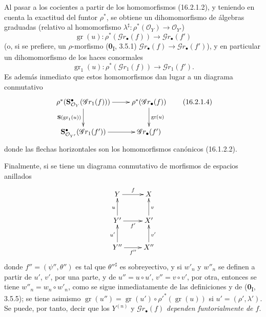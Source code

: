 \begin{env}[16.2.1]
Al pasar a los cocientes a partir de los homomorfismos (16.2.1.2), y teniendo en
cuenta la exactitud del funtor $\rho^*$, se obtiene un dihomomorfismo
de álgebras graduadas (relativo al homomorfismo
$\lambda^\sharp:\rho^*(\mathcal{O}_Y)\to\mathcal{O}_{Y'}$)
\[
  \operatorname{gr}(u):
  \rho^*(\mathscr{G}r_\bullet(f))
  \longrightarrow\mathscr{G}r_\bullet(f')
  \tag{16.2.1.3}
  \label{IV.16.2.1.3}
\]
(o, si se prefiere, un $\rho$-morfismo (\textbf{0}\textsubscript{I}, 3.5.1)
$\mathscr{G}r_\bullet(f)\to\mathscr{G}r_\bullet(f')$), y en particular un
dihomomorfismo de los haces conormales
\[
  \operatorname{gr}_1(u):
  \rho^*(\mathscr{G}r_1(f))\longrightarrow\mathscr{G}r_1(f').
\]
Es además inmediato que estos homomorfismos dan lugar a un diagrama
conmutativo
\[
  \xymatrix{
    \rho^*(\mathbf{S}_{\mathcal{O}_Y}^{\bullet}
      (\mathscr{G}r_1(f)))
      \ar[r] \ar[d]_-{\mathbf{S}(\operatorname{gr}_1(u))}
      & \rho^*(\mathscr{G}r_\bullet(f))
        \ar[d]^-{\operatorname{gr}(u)} \\
    \mathbf{S}_{\mathcal{O}_{Y'}}^{\bullet}
      (\mathscr{G}r_1(f'))
      \ar[r]
      & \mathscr{G}r_\bullet(f')
  }
  \tag{16.2.1.4}
  \label{IV.16.2.1.4}
\]
donde las flechas horizontales son los homomorfismos canónicos (16.1.2.2).

Finalmente, si se tiene un diagrama conmutativo de morfismos de espacios anillados
\[
  \xymatrix{
    Y \ar[r]^f & X \\
    Y' \ar[r]_{f'} \ar[u]^u & X' \ar[u]_v \\
    Y'' \ar[r]_{f''} \ar[u]^{u'} & X'' \ar[u]_{v'}
  }
\]
donde $f''=(\psi'',\theta'')$ es tal que $\theta''^\sharp$ es sobreyectivo, y si
$w'_n$ y $w''_n$ se definen a partir de $u'$, $v'$, por una parte, y de
$u''=u\circ u'$, $v''=v\circ v'$, por otra, entonces se tiene
$w''_n=w_n\circ w'_n$, como se sigue inmediatamente de las definiciones y de
(\textbf{0}\textsubscript{I}, 3.5.5); se tiene asimismo
$\operatorname{gr}(u'')=
\operatorname{gr}(u')\circ\rho'^*(\operatorname{gr}(u))$ si
$u'=(\rho',\lambda')$. Se puede, por tanto, decir que los $Y^{(n)}$ y
$\mathscr{G}r_\bullet(f)$ \emph{dependen funtorialmente de $f$}.
\end{env}

